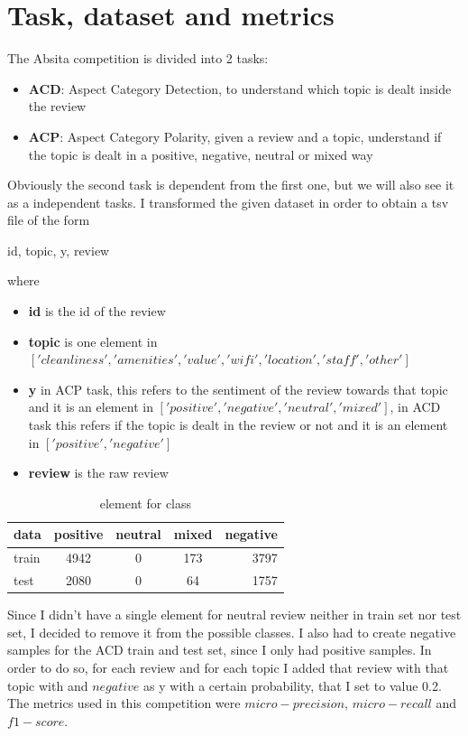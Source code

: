 \documentclass{article}
\begin{document}
    \section{Task, dataset and metrics}\label{sec:s1}
        The Absita competition is divided into 2 tasks:
        \begin{itemize}
            \item \textbf{ACD}: Aspect Category Detection, to understand which topic is dealt inside the review
            \item \textbf{ACP}: Aspect Category Polarity, given a review and a topic, understand if the topic is dealt in a positive, negative, neutral or mixed way
        \end{itemize}
        Obviously the second task is dependent from the first one, but we will also see it as a independent tasks.
        I transformed the given dataset in order to obtain a tsv file of the form
        \\\centerline{id, topic, y, review}
        where
        \begin{itemize}
            \item \textbf{id} is the id of the review
            \item \textbf{topic} is one element in $['cleanliness', 'amenities', 'value', 'wifi', 'location', 'staff', 'other']$
            \item \textbf{y} in ACP task, this refers to the sentiment of the review towards that topic and it is an element in $['positive', 'negative', 'neutral', 'mixed']$, in ACD task this refers if the topic is dealt in the review or not and it is an element in $['positive', 'negative']$
            \item \textbf{review} is the raw review
        \end{itemize}
        \begin{table}[h!]
            \begin{center}
                \caption{element for class}
                \label{tab:table1}
                \begin{tabular}{l|c|c|c|r}
                    \textbf{data} & \textbf{positive} & \textbf{neutral} & \textbf{mixed} & \textbf{negative}\\
                    \hline
                        train & 4942 & 0 & 173 & 3797\\
                        test & 2080 & 0 & 64 & 1757\\
                \end{tabular}
            \end{center}
        \end{table}
        Since I didn't have a single element for neutral review neither in train set nor test set, I decided to remove it from the possible classes.
        I also had to create negative samples for the ACD train and test set, since I only had positive samples.
        In order to do so, for each review and for each topic I added that review with that topic with and $negative$ as y with a certain probability, that I set to value 0.2.
        The metrics used in this competition were $micro-precision$, $micro-recall$ and $f1-score$.
\end{document}
